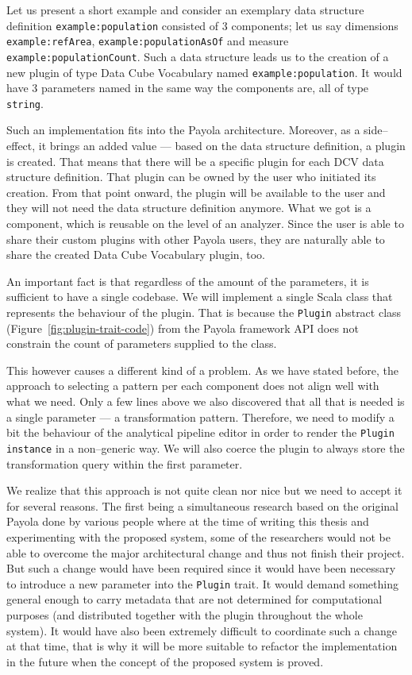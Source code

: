 \begin{sloppypar}
Let us present a short example and consider an exemplary data structure definition \texttt{example:population}
consisted of 3 
components; let us say dimensions \texttt{example:refArea}, \texttt{example:populationAsOf}
and measure \texttt{example:populationCount}. Such a data structure leads us to 
the creation of a new plugin of type Data Cube Vocabulary named 
\texttt{example:population}. It would have 3 parameters named in the same way the 
components are, all of type \texttt{string}.
\end{sloppypar}

Such an implementation fits into the Payola architecture. Moreover, as a side--effect, it brings
an added value --- based on the data structure definition, a plugin is created. 
That means that there will be a specific plugin for each DCV data structure 
definition. That plugin can be owned by the user who initiated its creation. 
From that point onward, the plugin will be available to the user and they
will not need the data structure definition anymore. What we got is a 
component, which is reusable on the level of an analyzer. Since the user is able to 
share their custom plugins with other Payola users, they are
naturally able to share the created Data Cube Vocabulary plugin, too. 

An important fact is that regardless of the amount of the parameters, it is sufficient 
to have a single codebase. We will implement a single Scala class that represents the behaviour 
of the plugin. That is because the \texttt{Plugin} abstract class (Figure~\ref{fig:plugin-trait-code})
from the Payola framework
API does not constrain the count of parameters supplied to the class.

This however causes a different kind of a problem. As we have stated before, the 
approach to selecting a pattern per each component does not align well with what we 
need. Only a few lines above we also discovered that all that is needed is a 
single parameter --- a transformation pattern. Therefore, we need to modify a bit the 
behaviour of the analytical pipeline editor in order to render the \texttt{Plugin instance}
in a non--generic way. We will also coerce the plugin to always store the transformation query 
within the first parameter.

We realize that this approach is not quite clean nor nice but we need to accept it for several reasons.
The first being a simultaneous research based on the original Payola done by various people where
at the time of writing this thesis and experimenting with the proposed system, some of the researchers 
would not be able to overcome the major architectural change and thus not finish their project.
But such a change would have been required since 
it would have been necessary to introduce a new parameter into the \texttt{Plugin} trait. 
It would demand something general enough to carry metadata that are not determined for 
computational purposes (and distributed together with the plugin throughout the whole system).
It would have also been extremely difficult to coordinate such 
a change at that time, that is why it will be more suitable to refactor the 
implementation in the future when the concept of the proposed system is 
proved.

